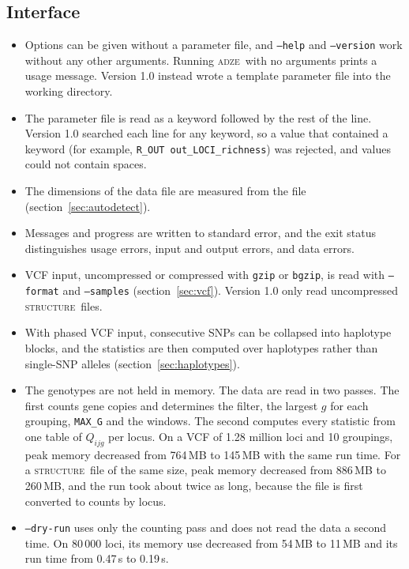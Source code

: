 \documentclass[11pt]{article}
\newcommand{\prog}{\textsc{adze}}
\newcommand{\structureprog}{\textsc{structure}}
\newcommand{\flag}[1]{\texttt{#1}}
\begin{document}
\subsection{Interface}

\begin{itemize}[leftmargin=1.2em]
\item Options can be given without a parameter file, and \flag{--help} and
  \flag{--version} work without any other arguments. Running \prog\ with no
  arguments prints a usage message. Version 1.0 instead wrote a template
  parameter file into the working directory.
\item The parameter file is read as a keyword followed by the rest of the
  line. Version 1.0 searched each line for any keyword, so a value that
  contained a keyword (for example, \texttt{R\_OUT out\_LOCI\_richness}) was
  rejected, and values could not contain spaces.
\item The dimensions of the data file are measured from the file
  (section~\ref{sec:autodetect}).
\item Messages and progress are written to standard error, and the exit status
  distinguishes usage errors, input and output errors, and data errors.
\item VCF input, uncompressed or compressed with \texttt{gzip} or
  \texttt{bgzip}, is read with \flag{--format} and \flag{--samples}
  (section~\ref{sec:vcf}). Version 1.0 only read uncompressed
  \structureprog\ files.
\item With phased VCF input, consecutive SNPs can be collapsed into
  haplotype blocks, and the statistics are then computed over haplotypes
  rather than single-SNP alleles (section~\ref{sec:haplotypes}).
\item The genotypes are not held in memory. The data are read in two passes.
  The first counts gene copies and determines the filter, the largest $g$ for
  each grouping, \texttt{MAX\_G} and the windows. The second computes every
  statistic from one table of $Q_{ijg}$ per locus. On a VCF of 1.28 million
  loci and 10 groupings, peak memory decreased from 764\,MB to 145\,MB with
  the same run time. For a \structureprog\ file of the
  same size, peak memory decreased from 886\,MB to 260\,MB, and the run took
  about twice as long, because the file is first converted to counts by locus.
\item \flag{--dry-run} uses only the counting pass and does not read the data
  a second time. On 80\,000 loci, its memory use decreased from 54\,MB to
  11\,MB and its run time from 0.47\,s to 0.19\,s.

\end{itemize}
\end{document}

